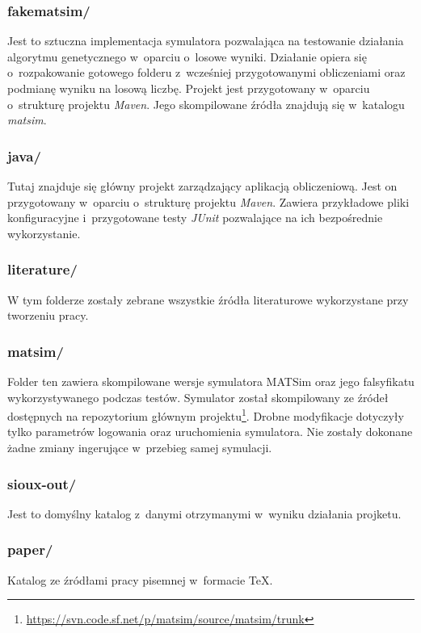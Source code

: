 \documentclass[twoside,12pt]{report}
\begin{document}
\subsubsection{fakematsim/}
Jest to sztuczna implementacja symulatora pozwalająca na testowanie działania algorytmu genetycznego w~oparciu o~losowe wyniki. Działanie opiera się o~rozpakowanie gotowego folderu z~wcześniej przygotowanymi obliczeniami oraz podmianę wyniku na losową liczbę. Projekt jest przygotowany w~oparciu o~strukturę projektu \textit{Maven}. Jego skompilowane źródła znajdują się  w~katalogu \textit{matsim}.

\subsubsection{java/}
Tutaj znajduje się główny projekt zarządzający aplikacją obliczeniową. Jest on przygotowany w~oparciu o~strukturę projektu \textit{Maven}. Zawiera przykładowe pliki konfiguracyjne i~przygotowane testy \textit{JUnit} pozwalające na ich bezpośrednie wykorzystanie.

\subsubsection{literature/}
W tym folderze zostały zebrane wszystkie źródła literaturowe wykorzystane przy tworzeniu pracy.

\subsubsection{matsim/}
Folder ten zawiera skompilowane wersje symulatora MATSim oraz jego falsyfikatu wykorzystywanego podczas testów. Symulator został skompilowany ze źródeł dostępnych na repozytorium głównym projektu\footnote {\url{https://svn.code.sf.net/p/matsim/source/matsim/trunk}}. Drobne modyfikacje dotyczyły tylko parametrów logowania oraz uruchomienia symulatora. Nie zostały dokonane żadne zmiany ingerujące w~przebieg samej symulacji.

\subsubsection{sioux-out/}
Jest to domyślny katalog z~danymi otrzymanymi w~wyniku działania projketu.

\subsubsection{paper/}
Katalog ze źródłami pracy pisemnej w~formacie TeX.
\end{document}
